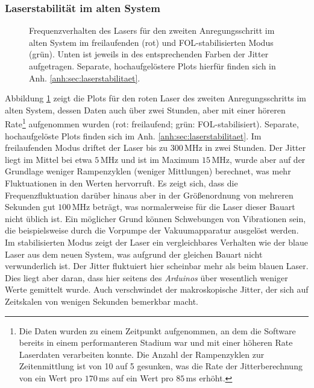 \subsubsection{Laserstabilität im alten
System}\label{subsubsec:stabilitaetsmessungen_software_altes_system}
\begin{figure}[h]
 	\centering
 	\footnotesize
	
	\caption[Laserfrequenzverhalten altes System]{Frequenzverhalten des Lasers für
	den zweiten Anregungsschritt im alten System im freilaufenden (rot) und
	FOL-stabilisierten Modus (grün). Unten ist jeweils in des entsprechenden Farben
	der Jitter aufgetragen. Separate, hochaufgelöstere Plots hierfür finden sich in
	Anh. \ref{anh:sec:laserstabilitaet}.}
	\label{fig:laserstabilitaet_alt_alles}
\end{figure}
Abbildung \ref{fig:laserstabilitaet_alt_alles} zeigt die Plots für den
roten Laser des zweiten Anregungsschritts im alten System, dessen Daten auch
über zwei Stunden, aber mit einer höreren Rate\footnote{Die Daten wurden zu
einem Zeitpunkt aufgenommen, an dem die Software bereits in einem performanteren
Stadium war und mit einer höheren Rate Laserdaten verarbeiten konnte. Die Anzahl
der Rampenzyklen zur Zeitenmittlung ist von 10 auf 5 gesunken, was die Rate
der Jitterberechnung von ein Wert pro $170\,$ms auf ein Wert pro $85\,$ms
erhöht.} aufgenommen wurden (rot:
freilaufend; grün:
FOL-stabilisiert).
Separate, hochaufgelöste Plots finden sich im Anh.
\ref{anh:sec:laserstabilitaet}. Im freilaufenden Modus driftet der Laser bis
zu $300\,$MHz in zwei Stunden. Der Jitter liegt im Mittel bei etwa $5\,$MHz und
ist im Maximum $15\,$MHz, wurde aber auf der Grundlage weniger Rampenzyklen
(weniger Mittlungen) berechnet, was mehr Fluktuationen in den Werten hervorruft.
Es zeigt sich, dass die Frequenzfluktuation darüber hinaus aber in der Größenordnung von mehreren Sekunden gut $100\,$MHz beträgt, was normalerweise für die Laser dieser Bauart
nicht üblich ist. Ein möglicher Grund können Schwebungen von Vibrationen sein,
die beispielsweise durch die Vorpumpe der Vakuumapparatur ausgelöst werden. Im
stabilisierten Modus zeigt der Laser ein vergleichbares Verhalten wie der blaue
Laser aus dem neuen System, was aufgrund der gleichen Bauart nicht verwunderlich ist. Der Jitter fluktuiert hier scheinbar mehr als beim blauen
Laser. Dies liegt aber daran, dass hier seitens des \textit{Arduinos} über
wesentlich weniger Werte gemittelt wurde. Auch verschwindet der makroskopische
Jitter, der sich auf Zeitskalen von wenigen Sekunden bemerkbar macht.\par
